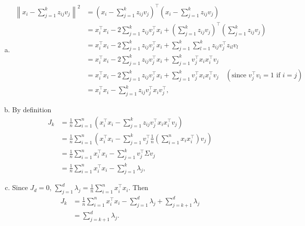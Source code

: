\documentclass[12pt,letterpaper,fleqn]{hmcpset}
\begin{document}
\begin{solution}
\begin{enumerate}[(a)] 
    \item 
    \begin{align*}
        \left\| x_i - \sum_{j=1}^k z_{ij}v_j \right\|^2 &= \left( x_i - \sum_{j=1}^k z_{ij}v_j \right)^\top \left( x_i - \sum_{j=1}^k z_{ij}v_j \right) \\
        &= x_i^\top x_i - 2\sum_{j=1}^k z_{ij}v_j^\top x_i + \left( \sum_{j=1}^k z_{ij}v_j \right)^\top \left( \sum_{j=1}^k z_{ij}v_j \right) \\
        &= x_i^\top x_i - 2\sum_{j=1}^k z_{ij}v_j^\top x_i + \sum_{j=1}^k \sum_{l=1}^k z_{ij}v_j^\top z_{il}v_l \\
        &= x_i^\top x_i - 2\sum_{j=1}^k z_{ij}v_j^\top x_i + \sum_{j=1}^k v_j^\top x_i x_i^\top v_j \\
        &= x_i^\top x_i - 2\sum_{j=1}^k z_{ij}v_j^\top x_i + \sum_{j=1}^k v_j^\top x_i x_i^\top v_j \quad (\text{since } v_j^\top v_i = 1 \text{ if } i = j) \\
        &= x_i^\top x_i - \sum_{j=1}^k z_{ij}v_j^\top x_i v_j^\top,
    \end{align*} 

    \item By definition
    \begin{align*}
        J_k &= \frac{1}{n} \sum_{i=1}^n \left( x_i^\top x_i - \sum_{j=1}^k z_{ij}v_j^\top x_i x_i^\top v_j \right) \\
        &= \frac{1}{n} \sum_{i=1}^n \left( x_i^\top x_i - \sum_{j=1}^k v_j^\top \frac{1}{n} \left( \sum_{i=1}^n x_i x_i^\top \right) v_j \right) \\
        &= \frac{1}{n} \sum_{i=1}^n x_i^\top x_i - \sum_{j=1}^k v_j^\top \Sigma v_j \\
        &= \frac{1}{n} \sum_{i=1}^n x_i^\top x_i - \sum_{j=1}^k \lambda_j,
    \end{align*}
    \item Since $J_d = 0$, $\sum_{j=1}^d \lambda_j = \frac{1}{n}\sum_{i=1}^n x_i^\top x_i$. Then
\begin{align*}
    J_k &= \frac{1}{n} \sum_{i=1}^n x_i^\top x_i - \sum_{j=1}^d \lambda_j + \sum_{j=k+1}^d \lambda_j \\
    &= \sum_{j=k+1}^d \lambda_j.
\end{align*}
\end{enumerate}
\end{solution}
\newpage
\end{document}
